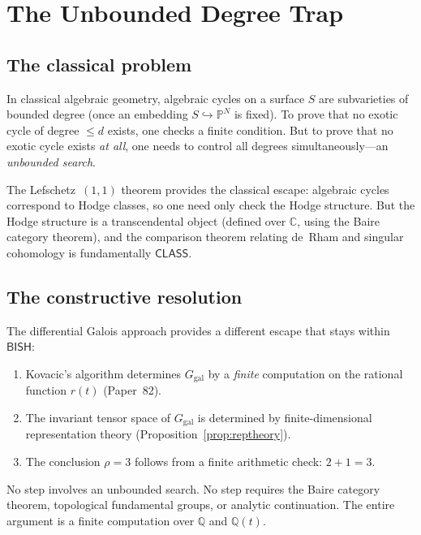 \documentclass[11pt]{article}
\theoremstyle{plain}
\theoremstyle{definition}
\theoremstyle{remark}
\newcommand{\Q}{\mathbb{Q}}
\newcommand{\C}{\mathbb{C}}
\newcommand{\Ggal}{G_{\mathrm{gal}}}
\newcommand{\BISH}{\mathsf{BISH}}
\newcommand{\CLASS}{\mathsf{CLASS}}
\begin{document}
\section{The Unbounded Degree Trap}
\label{sec:trap}

\subsection{The classical problem}

In classical algebraic geometry, algebraic cycles on a surface $S$ are subvarieties of bounded degree (once an embedding $S \hookrightarrow \mathbb{P}^N$ is fixed).
To prove that no exotic cycle of degree $\leq d$ exists, one checks a finite condition.
But to prove that no exotic cycle exists \emph{at all}, one needs to control all degrees simultaneously---an \emph{unbounded search}.

The Lefschetz~$(1,1)$ theorem provides the classical escape: algebraic cycles correspond to Hodge classes, so one need only check the Hodge structure.
But the Hodge structure is a transcendental object (defined over $\C$, using the Baire category theorem), and the comparison theorem relating de~Rham and singular cohomology is fundamentally $\CLASS$.

\subsection{The constructive resolution}

The differential Galois approach provides a different escape that stays within $\BISH$:
\begin{enumerate}
  \item Kovacic's algorithm determines $\Ggal$ by a \emph{finite} computation on the rational function $r(t)$ (Paper~82).
  \item The invariant tensor space of $\Ggal$ is determined by finite-dimensional representation theory (Proposition~\ref{prop:reptheory}).
  \item The conclusion $\rho = 3$ follows from a finite arithmetic check: $2 + 1 = 3$.
\end{enumerate}

No step involves an unbounded search.
No step requires the Baire category theorem, topological fundamental groups, or analytic continuation.
The entire argument is a finite computation over $\Q$ and $\Q(t)$.
\end{document}
